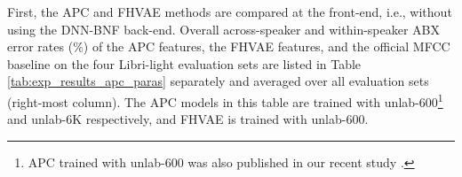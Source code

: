 \documentclass[transmag]{IEEEtran}
\begin{document}
First,  the APC and FHVAE methods are compared at the front-end, i.e., without using  the DNN-BNF back-end. Overall across-speaker and within-speaker ABX error rates  ($\%$) of the APC features,  the FHVAE features, and the official MFCC baseline  \cite{kahn2019librilight} on the four Libri-light evaluation sets are listed in Table  \ref{tab:exp_results_apc_paras} separately and averaged over all evaluation sets (right-most column). 
The APC models in this table are trained with unlab-600\footnote{APC trained with unlab-600 was also published in our recent study \cite{feng2020unsupervised}.} and unlab-6K respectively, and FHVAE is trained with unlab-600.
\end{document}
